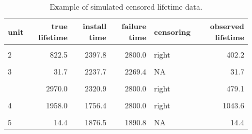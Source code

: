 \begin{table}
\centering
\caption{\label{tab:sim_censored_units}Example of simulated censored lifetime data.}
\centering
\begin{tabular}[t]{lrrrlr}
\toprule
unit & true lifetime & install time & failure time & censoring & observed lifetime\\
\midrule
\cellcolor{gray!10}{2} & \cellcolor{gray!10}{2397.8} & \cellcolor{gray!10}{1500.0} & \cellcolor{gray!10}{2397.8} & \cellcolor{gray!10}{interval} & \cellcolor{gray!10}{897.8}\\
2 & 822.5 & 2397.8 & 2800.0 & right & 402.2\\
\cellcolor{gray!10}{3} & \cellcolor{gray!10}{1461.5} & \cellcolor{gray!10}{1500.0} & \cellcolor{gray!10}{2237.7} & \cellcolor{gray!10}{interval} & \cellcolor{gray!10}{737.7}\\
3 & 31.7 & 2237.7 & 2269.4 & NA & 31.7\\
\cellcolor{gray!10}{3} & \cellcolor{gray!10}{51.5} & \cellcolor{gray!10}{2269.4} & \cellcolor{gray!10}{2320.9} & \cellcolor{gray!10}{NA} & \cellcolor{gray!10}{51.5}\\
\addlinespace
3 & 2970.0 & 2320.9 & 2800.0 & right & 479.1\\
\cellcolor{gray!10}{4} & \cellcolor{gray!10}{1648.5} & \cellcolor{gray!10}{1500.0} & \cellcolor{gray!10}{1756.4} & \cellcolor{gray!10}{interval} & \cellcolor{gray!10}{256.4}\\
4 & 1958.0 & 1756.4 & 2800.0 & right & 1043.6\\
\cellcolor{gray!10}{5} & \cellcolor{gray!10}{741.7} & \cellcolor{gray!10}{1500.0} & \cellcolor{gray!10}{1876.5} & \cellcolor{gray!10}{interval} & \cellcolor{gray!10}{376.5}\\
5 & 14.4 & 1876.5 & 1890.8 & NA & 14.4\\
\bottomrule
\end{tabular}
\end{table}
